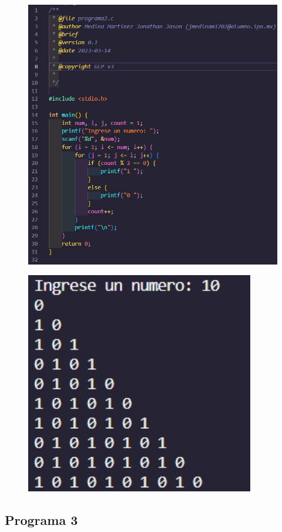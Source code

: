 \documentclass{article}
\begin{document}
\begin{figure}[H]
    \centering
    \includegraphics[width = 15cm]{img2a.jpg}
\end{figure}
\begin{figure}[H]
    \centering
    \includegraphics[width = 10cm]{img2b.jpg}
\end{figure}
\newpage
\subsection{Programa 3}
\end{document}
